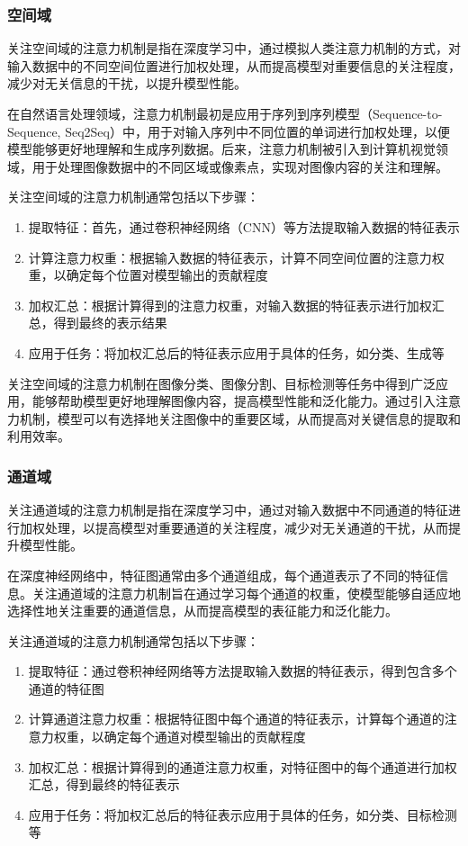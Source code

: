 \documentclass[withoutpreface,bwprint]{cumcmthesis} %
\begin{document}
\subsubsection{空间域}

关注空间域的注意力机制是指在深度学习中，通过模拟人类注意力机制的方式，对输入数据中的不同空间位置进行加权处理，从而提高模型对重要信息的关注程度，减少对无关信息的干扰，以提升模型性能。

在自然语言处理领域，注意力机制最初是应用于序列到序列模型（Sequence-to-Sequence, Seq2Seq）中，用于对输入序列中不同位置的单词进行加权处理，以便模型能够更好地理解和生成序列数据。后来，注意力机制被引入到计算机视觉领域，用于处理图像数据中的不同区域或像素点，实现对图像内容的关注和理解。

关注空间域的注意力机制通常包括以下步骤：
\begin{enumerate}
    \item 提取特征：首先，通过卷积神经网络（CNN）等方法提取输入数据的特征表示
    \item 计算注意力权重：根据输入数据的特征表示，计算不同空间位置的注意力权重，以确定每个位置对模型输出的贡献程度
    \item 加权汇总：根据计算得到的注意力权重，对输入数据的特征表示进行加权汇总，得到最终的表示结果
    \item 应用于任务：将加权汇总后的特征表示应用于具体的任务，如分类、生成等
    
\end{enumerate}

关注空间域的注意力机制在图像分类、图像分割、目标检测等任务中得到广泛应用，能够帮助模型更好地理解图像内容，提高模型性能和泛化能力。通过引入注意力机制，模型可以有选择地关注图像中的重要区域，从而提高对关键信息的提取和利用效率。


\subsubsection{通道域}

关注通道域的注意力机制是指在深度学习中，通过对输入数据中不同通道的特征进行加权处理，以提高模型对重要通道的关注程度，减少对无关通道的干扰，从而提升模型性能。

在深度神经网络中，特征图通常由多个通道组成，每个通道表示了不同的特征信息。关注通道域的注意力机制旨在通过学习每个通道的权重，使模型能够自适应地选择性地关注重要的通道信息，从而提高模型的表征能力和泛化能力。

关注通道域的注意力机制通常包括以下步骤：

\begin{enumerate}
    \item 提取特征：通过卷积神经网络等方法提取输入数据的特征表示，得到包含多个通道的特征图
    \item 计算通道注意力权重：根据特征图中每个通道的特征表示，计算每个通道的注意力权重，以确定每个通道对模型输出的贡献程度
    \item 加权汇总：根据计算得到的通道注意力权重，对特征图中的每个通道进行加权汇总，得到最终的特征表示
    \item 应用于任务：将加权汇总后的特征表示应用于具体的任务，如分类、目标检测等
\end{enumerate}
\end{document}
